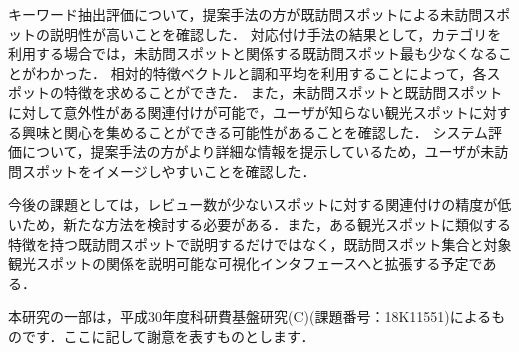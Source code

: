 \documentclass[submit,techrep,noauthor]{ipsj}
\begin{document}
キーワード抽出評価について，提案手法の方が既訪問スポットによる未訪問スポットの説明性が高いことを確認した．
対応付け手法の結果として，カテゴリを利用する場合では，未訪問スポットと関係する既訪問スポット最も少なくなることがわかった．
相対的特徴ベクトルと調和平均を利用することによって，各スポットの特徴を求めることができた．
また，未訪問スポットと既訪問スポットに対して意外性がある関連付けが可能で，ユーザが知らない観光スポットに対する興味と関心を集めることができる可能性があることを確認した．
システム評価について，提案手法の方がより詳細な情報を提示しているため，ユーザが未訪問スポットをイメージしやすいことを確認した．

今後の課題としては，レビュー数が少ないスポットに対する関連付けの精度が低いため，新たな方法を検討する必要がある．また，ある観光スポットに類似する特徴を持つ既訪問スポットで説明するだけではなく，既訪問スポット集合と対象観光スポットの関係を説明可能な可視化インタフェースへと拡張する予定である．

\begin{acknowledgment}
本研究の一部は，平成30年度科研費基盤研究(C)(課題番号：18K11551)によるものです．ここに記して謝意を表すものとします．
\end{acknowledgment}
\end{document}

